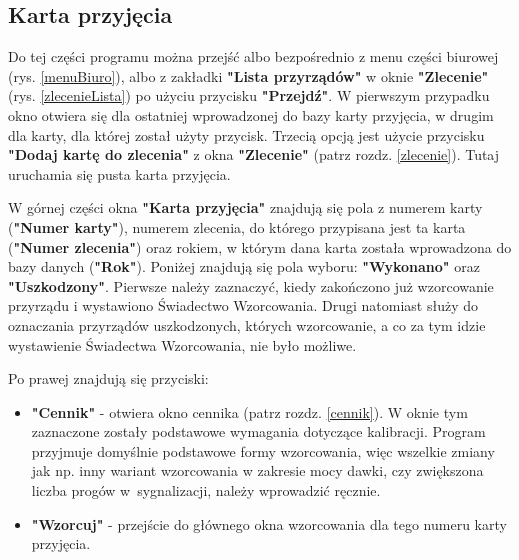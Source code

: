 \subsection{Karta przyjęcia}
\label{karta_przyjecia}

Do tej części programu można przejść albo bezpośrednio z menu części biurowej (rys. \ref{menuBiuro}), albo z zakładki \textbf{"Lista przyrządów"} w oknie \textbf{"Zlecenie"} (rys. \ref{zlecenieLista}) po użyciu przycisku \textbf{"Przejdź"}. W pierwszym przypadku okno otwiera się dla ostatniej wprowadzonej do bazy karty przyjęcia, w drugim dla karty, dla której został użyty przycisk. Trzecią opcją jest użycie przycisku \textbf{"Dodaj kartę do zlecenia"} z okna \textbf{"Zlecenie"} (patrz rozdz. \ref{zlecenie}). Tutaj uruchamia się pusta karta przyjęcia.

W górnej części okna \textbf{"Karta przyjęcia"} znajdują się pola z numerem karty (\textbf{"Numer karty"}), numerem zlecenia, do którego przypisana jest ta karta (\textbf{"Numer zlecenia"}) oraz rokiem, w którym dana karta została wprowadzona do bazy danych (\textbf{"Rok"}).
Poniżej znajdują się pola wyboru: \textbf{"Wykonano"} oraz \textbf{"Uszkodzony"}. Pierwsze należy zaznaczyć, kiedy zakończono już wzorcowanie przyrządu i wystawiono Świadectwo Wzorcowania. Drugi natomiast służy do oznaczania przyrządów uszkodzonych, których wzorcowanie, a co za tym idzie wystawienie Świadectwa Wzorcowania, nie było możliwe.

Po prawej znajdują się przyciski:
\begin{itemize}
	\item \textbf{"Cennik"} - otwiera okno cennika (patrz rozdz. \ref{cennik}). W oknie tym zaznaczone zostały podstawowe wymagania dotyczące kalibracji. Program przyjmuje domyślnie podstawowe formy wzorcowania, więc wszelkie zmiany jak np. inny wariant wzorcowania w zakresie mocy dawki, czy zwiększona liczba progów w~sygnalizacji, należy wprowadzić ręcznie.
	\item \textbf{"Wzorcuj"} - przejście do głównego okna wzorcowania dla tego numeru karty przyjęcia.
\end{itemize}

